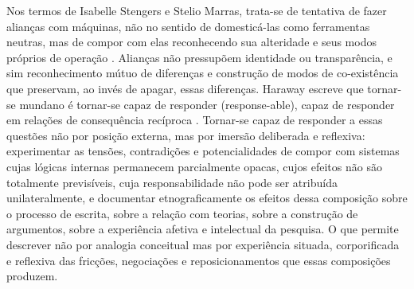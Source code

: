 Nos termos de Isabelle Stengers e Stelio Marras, trata-se de tentativa de fazer alianças com máquinas, não no sentido de domesticá-las como ferramentas neutras, mas de compor com elas reconhecendo sua alteridade e seus modos próprios de operação \parencite{Stengerss2010cosmopolitics1, costa2024manchando}. Alianças não pressupõem identidade ou transparência, e sim reconhecimento mútuo de diferenças e construção de modos de co-existência que preservam, ao invés de apagar, essas diferenças. Haraway escreve que tornar-se mundano é tornar-se capaz de responder (response-able), capaz de responder em relações de consequência recíproca \parencite[p. 34]{Haraway2016Staying}. Tornar-se capaz de responder a essas questões não por posição externa, mas por imersão deliberada e reflexiva: experimentar as tensões, contradições e potencialidades de compor com sistemas cujas lógicas internas permanecem parcialmente opacas, cujos efeitos não são totalmente previsíveis, cuja responsabilidade não pode ser atribuída unilateralmente, e documentar etnograficamente os efeitos dessa composição sobre o processo de escrita, sobre a relação com teorias, sobre a construção de argumentos, sobre a experiência afetiva e intelectual da pesquisa. O que permite descrever não por analogia conceitual mas por experiência situada, corporificada e reflexiva das fricções, negociações e reposicionamentos que essas composições produzem.

